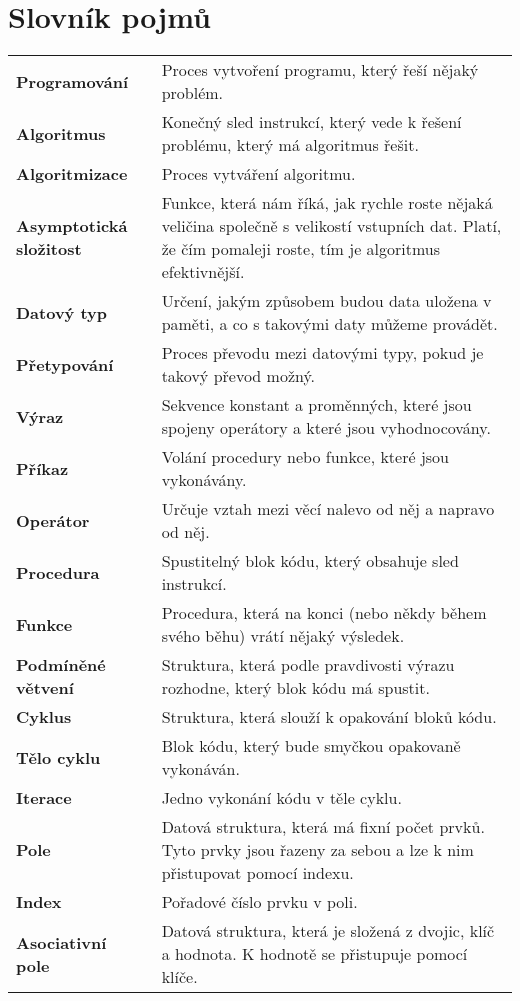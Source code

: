 \chapter{Slovník pojmů}
\label{app:slovnik}
\noindent\begin{longtable}[l]{@{}lp{12cm}@{}}
	\textbf{Programování} & Proces vytvoření programu, který řeší nějaký problém. \\
	\textbf{Algoritmus} & Konečný sled instrukcí, který vede k řešení problému, který má algoritmus řešit. \\
	\textbf{Algoritmizace} & Proces vytváření algoritmu. \\
	\textbf{Asymptotická složitost} & Funkce, která nám říká, jak rychle roste nějaká veličina společně s velikostí vstupních dat. Platí, že čím pomaleji roste, tím je algoritmus efektivnější. \\
	\textbf{Datový typ} & Určení, jakým způsobem budou data uložena v paměti, a co s takovými daty můžeme provádět. \\
	\textbf{Přetypování} & Proces převodu mezi datovými typy, pokud je takový převod možný. \\
	\textbf{Výraz} & Sekvence konstant a proměnných, které jsou spojeny operátory a které jsou vyhodnocovány. \\
	\textbf{Příkaz} & Volání procedury nebo funkce, které jsou vykonávány. \\
	\textbf{Operátor} & Určuje vztah mezi věcí nalevo od něj a napravo od něj.\\
	\textbf{Procedura} & Spustitelný blok kódu, který obsahuje sled instrukcí.\\
	\textbf{Funkce} & Procedura, která na konci (nebo někdy během svého běhu) vrátí nějaký výsledek.\\
	\textbf{Podmíněné větvení} & Struktura, která podle pravdivosti výrazu rozhodne, který blok kódu má spustit.\\
	\textbf{Cyklus} & Struktura, která slouží k opakování bloků kódu.\\
	\textbf{Tělo cyklu} & Blok kódu, který bude smyčkou opakovaně vykonáván.\\
	\textbf{Iterace} & Jedno vykonání kódu v těle cyklu.\\
	\textbf{Pole} & Datová struktura, která má fixní počet prvků. Tyto prvky jsou řazeny za sebou a lze k nim přistupovat pomocí indexu.\\
	\textbf{Index} & Pořadové číslo prvku v poli.\\
	\textbf{Asociativní pole} & Datová struktura, která je složená z dvojic, klíč a hodnota. K hodnotě se přistupuje pomocí klíče.\\

\end{longtable}
